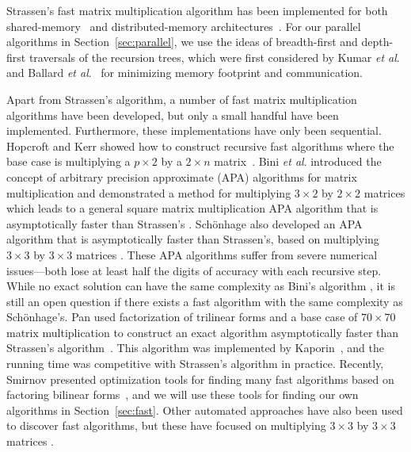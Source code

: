 \documentclass[preprint]{sigplanconf}
\begin{document}
Strassen's fast matrix multiplication algorithm has been implemented for both shared-memory~\cite{kumar1995tensor, d2011exploiting} and distributed-memory architectures~\cite{grayson1996high, luo1995scalable, ballard2012communication}.
For our parallel algorithms in Section~\ref{sec:parallel}, we use the ideas of breadth-first and depth-first traversals of the recursion trees, which were first considered by Kumar \emph{et al}.~\cite{kumar1995tensor} and Ballard \emph{et al}.~\cite{ballard2012communication} for minimizing memory footprint and communication.

Apart from Strassen's algorithm, a number of fast matrix multiplication algorithms have been developed,
but only a small handful have been implemented.
Furthermore, these implementations have only been sequential.
Hopcroft and Kerr showed how to construct recursive fast algorithms where the base case is multiplying a $p \times 2$ by a $2 \times n$ matrix~\cite{hopcroft1971minimizing}.
Bini \emph{et al}. introduced the concept of arbitrary precision approximate (APA) algorithms for matrix multiplication and demonstrated a method for multiplying $3\times2$ by $2\times2$ matrices which leads to a general square matrix multiplication APA algorithm that is asymptotically faster than Strassen's \cite{BCRL79}.
Sch\"{o}nhage also developed an APA algorithm that is asymptotically faster than Strassen's, based on multiplying $3\times3$ by $3\times3$ matrices \cite{Schonhage81}.
These APA algorithms suffer from severe numerical issues---both lose at least half the digits of accuracy with each recursive step.
While no exact solution can have the same complexity as Bini's algorithm \cite{hopcroft1971minimizing},
it is still an open question if there exists a fast algorithm with the same complexity as Sch\"{o}nhage's.
Pan used factorization of trilinear forms and a base case of $70 \times 70$ matrix multiplication to construct an exact algorithm asymptotically faster than Strassen's algorithm~\cite{pan1978strassen}.
This algorithm was implemented by Kaporin~\cite{kaporin2004aggregation}, and the running time was competitive with Strassen's algorithm in practice.
Recently, Smirnov presented optimization tools for finding many fast algorithms based on factoring bilinear forms~\cite{smirnov2013bilinear},
and we will use these tools for finding our own algorithms in Section~\ref{sec:fast}.
Other automated approaches have also been used to discover fast algorithms, but these have focused on multiplying $3\times 3$ by $3\times 3$ matrices \cite{JM86,CBH11,OKM13}.
\end{document}
